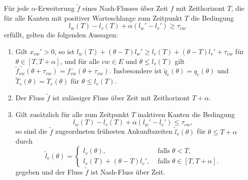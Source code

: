 \begin{lemma}
	Für jede $\alpha$-Erweiterung $\tilde{f}$ eines Nash-Flusses über Zeit $f$ mit Zeithorizont $T$, die für alle Kanten mit positiver Warteschlange zum Zeitpunkt $T$ die Bedingung
	$$l_w(T) - l_v(T) + \alpha(l_w' - l_v') \geq \tau_{vw}$$
	erfüllt, gelten die folgenden Aussagen:
	\begin{enumerate}[label=(\roman*)]
		\item Gilt $x_{vw}' > 0$, so ist $l_w(T) + (\theta - T)l_w' \geq l_v(T) + (\theta - T)l_v' + \tau_{vw}$ für $\theta\in[T, T+\alpha]$, und für alle $vw\in E $ und $\theta \leq l_v(T)$ gilt  $\tilde{f}^-_{vw}(\theta + \tau_{vw})=f^-_{vw}(\theta + \tau_{vw})$.
		Insbesondere ist $\tilde{q}_e(\theta) = q_e(\theta)$ und $\tilde{T}_e(\theta) = T_e(\theta)$ für $\theta \leq l_v(T)$.
		\item Der Fluss $\tilde{f}$ ist zulässiger Fluss über Zeit mit Zeithorizont $T+\alpha$.
		\item Gilt zusätzlich für alle zum Zeitpunkt $T$ inaktiven Kanten die Bedingung $$
		l_w(T) - l_v(T) + \alpha(l_w' -l_v') \leq \tau_{vw},
		$$
		so sind die $\tilde{f}$ zugeordneten frühesten Ankunftszeiten $\tilde{l}_v(\theta)$ für $\theta \leq T+\alpha$ durch
		$$\tilde{l}_v(\theta) = \begin{cases}
		l_v(\theta), & \text{ falls $\theta < T$,} \\
		l_v(T) + (\theta - T) l_v', & \text{ falls $\theta \in [T, T+\alpha]$.}
		\end{cases}$$
		gegeben und der Fluss $\tilde{f}$ ist Nash-Fluss über Zeit.
	\end{enumerate}
\end{lemma}
